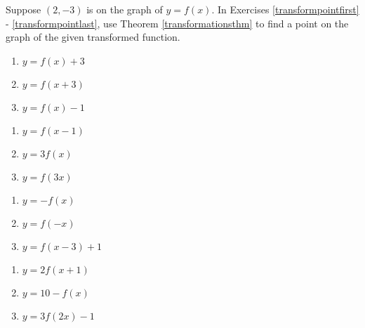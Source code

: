 \documentclass{ximera}
\begin{document}
	\author{Stitz-Zeager}


\label{ExercisesforTransformations}

Suppose $(2,-3)$ is on the graph of $y = f(x)$.  In Exercises \ref{transformpointfirst} - \ref{transformpointlast}, use Theorem \ref{transformationsthm} to find a point on the graph of the given transformed function.  

\begin{multicols}{3}
\begin{enumerate}

\item $y = f(x)+3$ \label{transformpointfirst}
\item $y = f(x+3)$
\item $y = f(x)-1$

\setcounter{HW}{\value{enumi}}
\end{enumerate}
\end{multicols}

\begin{multicols}{3}
\begin{enumerate}
\setcounter{enumi}{\value{HW}}

\item $y = f(x-1)$
\item $y = 3f(x)$
\item $y = f(3x)$

\setcounter{HW}{\value{enumi}}
\end{enumerate}
\end{multicols}

\begin{multicols}{3}
\begin{enumerate}
\setcounter{enumi}{\value{HW}}

\item $y = -f(x)$
\item $y = f(-x)$
\item $y = f(x-3)+1$

\setcounter{HW}{\value{enumi}}
\end{enumerate}
\end{multicols}

\begin{multicols}{3}
\begin{enumerate}
\setcounter{enumi}{\value{HW}}

\item $y = 2f(x+1)$
\item $y = 10 - f(x)$
\item $y = 3f(2x) - 1$

\setcounter{HW}{\value{enumi}}
\end{enumerate}
\end{multicols}
\end{document}
